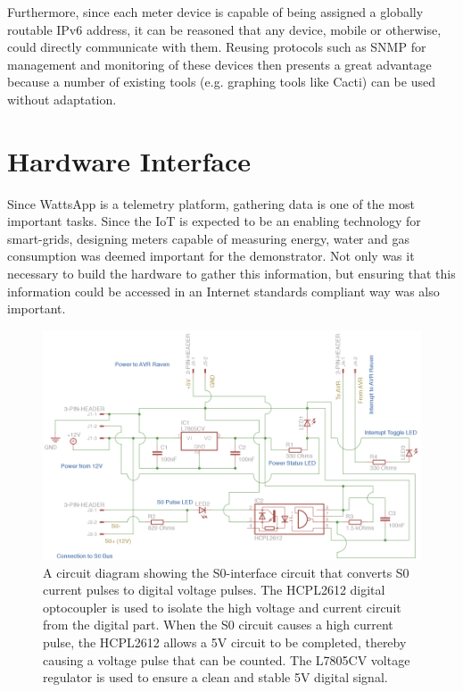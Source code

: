 \documentclass[10pt, conference, compsocconf, english]{IEEEtran}
\begin{document}
Furthermore, since each meter device is capable of being assigned
a globally routable IPv6 address, it can be reasoned that any device,
mobile or otherwise, could directly communicate with them. Reusing
protocols such as SNMP for management and monitoring of these devices
then presents a great advantage because a number of existing tools
(e.g. graphing tools like Cacti) can be used without adaptation.


\section{Hardware Interface}

Since WattsApp is a telemetry platform, gathering data is one of the
most important tasks. Since the IoT is expected to be an enabling
technology for smart-grids, designing meters capable of measuring
energy, water and gas consumption was deemed important for the demonstrator.
Not only was it necessary to build the hardware to gather this information,
but ensuring that this information could be accessed in an Internet
standards compliant way was also important.

\begin{figure}[t]
\begin{centering}
\includegraphics[scale=.75]{images/schematic} 
\par\end{centering}

\caption{A circuit diagram showing the S0-interface circuit that converts S0
current pulses to digital voltage pulses. The HCPL2612 digital optocoupler
is used to isolate the high voltage and current circuit from the digital
part. When the S0 circuit causes a high current pulse, the HCPL2612
allows a 5V circuit to be completed, thereby causing a voltage pulse
that can be counted. The L7805CV voltage regulator is used to ensure
a clean and stable 5V digital signal.}


\label{fig:S0-interface} 
\end{figure}
\end{document}
